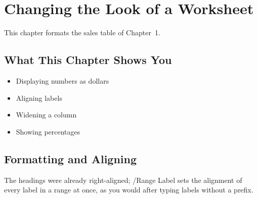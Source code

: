 \chapter{Changing the Look of a Worksheet}

This chapter formats the sales table of Chapter~1.

\section{What This Chapter Shows You}
\begin{itemize}
\item Displaying numbers as dollars
\item Aligning labels
\item Widening a column
\item Showing percentages
\end{itemize}

\section{Formatting and Aligning}
\begin{Keystrokes}
\end{Keystrokes}
The headings were already right-aligned; /Range Label sets the alignment
of every label in a range at once, as you would after typing labels without
a prefix.

